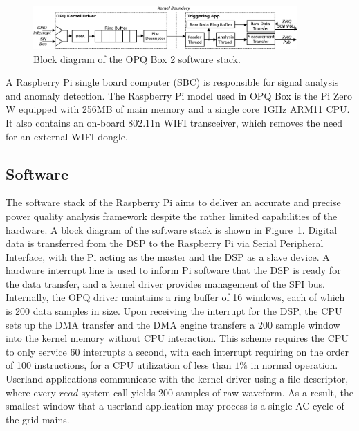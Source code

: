 \begin{figure}[h]
  \begin{center}
  \includegraphics[width=0.9\textwidth]{images/opq-box/opqbox_software.png}
  \end{center}
  \caption{Block diagram of the OPQ Box 2 software stack.}
  \label{fig:opq:3}
\end{figure}

A Raspberry Pi single board computer (SBC) is responsible for signal analysis and anomaly detection.
The Raspberry Pi model used in OPQ Box is the Pi Zero W equipped with 256MB of main memory and a single core 1GHz ARM11 CPU. It also contains an on-board 802.11n WIFI transceiver, which removes the need for an external WIFI dongle.

\subsection{Software}\label{subsec:software}

The software stack of the Raspberry Pi aims to deliver an accurate and precise power quality analysis framework despite the rather limited capabilities of the hardware.
A block diagram of the software stack is shown in Figure~\ref{fig:opq:3}.
Digital data is transferred from the DSP to the Raspberry Pi via Serial Peripheral Interface, with the Pi acting as the master and the DSP as a slave device.
A hardware interrupt line is used to inform Pi software that the DSP is ready for the data transfer, and a kernel driver provides management of the SPI bus.
Internally, the OPQ driver maintains a ring buffer of 16 windows, each of which is 200 data samples in size.
Upon receiving the interrupt for the DSP, the CPU sets up the DMA transfer and the DMA engine transfers a 200 sample window into the kernel memory without CPU interaction.
This scheme requires the CPU to only service 60 interrupts a second, with each interrupt requiring on the order of 100 instructions, for a CPU utilization of less than $1\%$ in normal operation.
Userland applications communicate with the kernel driver using a file descriptor, where every $read$ system call yields 200 samples of raw waveform.
As a result, the smallest window that a userland application may process is a single AC cycle of the grid mains.

